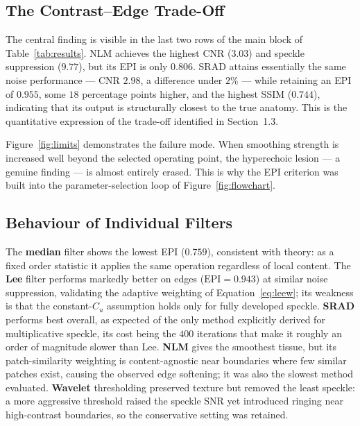 \documentclass[12pt,a4paper,oneside]{report}
\begin{document}
\subsection{The Contrast--Edge Trade-Off}

The central finding is visible in the last two rows of the main block of
Table~\ref{tab:results}. NLM achieves the highest CNR ($3.03$) and speckle
suppression ($9.77$), but its EPI is only $0.806$. SRAD attains essentially the
same noise performance --- CNR $2.98$, a difference under $2\%$ --- while
retaining an EPI of $0.955$, some $18$ percentage points higher, and the highest
SSIM ($0.744$), indicating that its output is structurally closest to the true
anatomy. This is the quantitative expression of the trade-off identified in
Section~1.3.



Figure~\ref{fig:limits} demonstrates the failure mode. When smoothing strength is
increased well beyond the selected operating point, the hyperechoic lesion --- a
genuine finding --- is almost entirely erased. This is why the EPI criterion was
built into the parameter-selection loop of Figure~\ref{fig:flowchart}.





\subsection{Behaviour of Individual Filters}

The \textbf{median} filter shows the lowest EPI ($0.759$), consistent with theory:
as a fixed order statistic it applies the same operation regardless of local
content. The \textbf{Lee} filter performs markedly better on edges
($\mathrm{EPI}=0.943$) at similar noise suppression, validating the adaptive
weighting of Equation~\eqref{eq:leew}; its weakness is that the constant-$C_u$
assumption holds only for fully developed speckle. \textbf{SRAD} performs best
overall, as expected of the only method explicitly derived for multiplicative
speckle, its cost being the $400$ iterations that make it roughly an order of
magnitude slower than Lee. \textbf{NLM} gives the smoothest tissue, but its
patch-similarity weighting is content-agnostic near boundaries where few similar
patches exist, causing the observed edge softening; it was also the slowest method
evaluated. \textbf{Wavelet} thresholding preserved texture but removed the least
speckle: a more aggressive threshold raised the speckle SNR yet introduced ringing
near high-contrast boundaries, so the conservative setting was retained.
\end{document}
